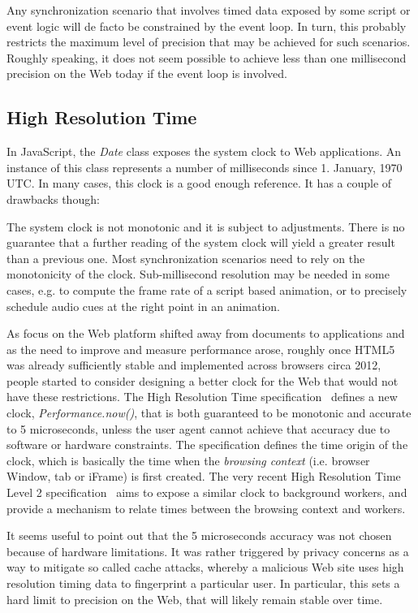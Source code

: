 Any synchronization scenario that involves timed data exposed by some script
or event logic will de facto be constrained by the event loop. In turn, this
probably restricts the maximum level of precision that may be achieved for
such scenarios. Roughly speaking, it does not seem possible to achieve less
than one millisecond precision on the Web today if the event loop is involved.


\subsection{High Resolution Time}
\label{sec:hrt}

In JavaScript, the \emph{Date} class exposes the system clock to Web
applications. An instance of this class represents a number of milliseconds
since 1. January, 1970 UTC. In many cases, this clock is a good enough
reference. It has a couple of drawbacks though:

The system clock is not monotonic and it is subject to adjustments. There is
no guarantee that a further reading of the system clock will yield a greater
result than a previous one. Most synchronization scenarios need to rely on the
monotonicity of the clock. Sub-millisecond resolution may be needed in some
cases, e.g. to compute the frame rate of a script based animation, or to
precisely schedule audio cues at the right point in an animation.

As focus on the Web platform shifted away from documents to applications and
as the need to improve and measure performance arose, roughly once HTML5 was
already sufficiently stable and implemented across browsers circa 2012, people
started to consider designing a better clock for the Web that would not have
these restrictions. The High Resolution Time specification~\cite{hrt1} defines
a new clock, \emph{Performance.now()}, that is both guaranteed to be monotonic
and accurate to 5 microseconds, unless the user agent cannot achieve that
accuracy due to software or hardware constraints. The specification defines
the time origin of the clock, which is basically the time when the
\emph{browsing context} (i.e. browser Window, tab or iFrame) is first created.
The very recent High Resolution Time Level 2 specification~\cite{hrt2} aims to
expose a similar clock to background workers, and provide a mechanism to
relate times between the browsing context and workers.

It seems useful to point out that the 5 microseconds accuracy was not chosen
because of hardware limitations. It was rather triggered by privacy concerns
as a way to mitigate so called cache attacks, whereby a malicious Web site
uses high resolution timing data to fingerprint a particular user. In
particular, this sets a hard limit to precision on the Web, that will likely
remain stable over time.


